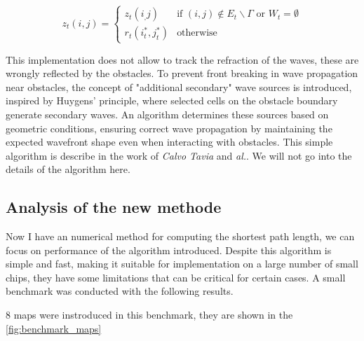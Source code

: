 \documentclass[../main.tex]{subfiles}
\begin{document}
$$z_t (i, j) = 
\begin{cases}
	z_t(i_, j) & \text{if } (i, j) \notin E_t \backslash \Gamma \text{ or } W_t = \emptyset\\
	r_t(i_t^{*}, j_t^{*}) & \text{otherwise}
\end{cases}
$$

This implementation does not allow to track the refraction of the waves, these are wrongly reflected by the obstacles. To prevent front breaking in wave propagation near obstacles, the concept of "additional secondary" wave sources is introduced, inspired by Huygens' principle, where selected cells on the obstacle boundary generate secondary waves. An algorithm determines these sources based on geometric conditions, ensuring correct wave propagation by maintaining the expected wavefront shape even when interacting with obstacles. This simple algorithm is describe in the work of \textit{Calvo Tavia} and \textit{al.}\cite{tapia_2016}. We will not go into the details of the algorithm here.


\subsection{Analysis of the new methode}

Now I have an numerical method for computing the shortest path length, we can focus on performance of the algorithm introduced. Despite this algorithm is simple and fast, making it suitable for implementation on a large number of small chips, they have some limitations that can be critical for certain cases. A small benchmark was conducted with the following results.


8 maps were instroduced in this benchmark, they are shown in the \autoref{fig:benchmark_maps}
\end{document}
